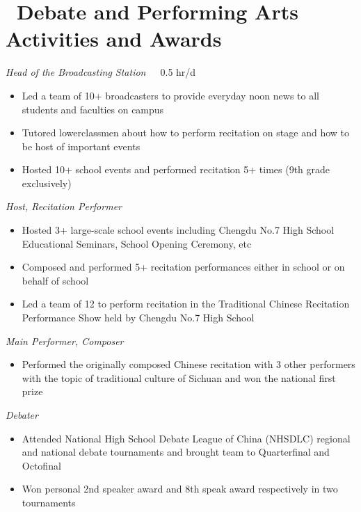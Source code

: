 \documentclass{resume}
\begin{document}

\section{\faHeartO\ Debate and Performing Arts Activities and Awards}
\emph{Head of the Broadcasting Station}\ \ \ 0.5 hr/d
\begin{itemize}
  \item Led a team of 10+ broadcasters to provide everyday noon news to all students and faculties on campus
  \item Tutored lowerclassmen about how to perform recitation on stage and how to be host of important events
  \item Hosted 10+ school events and performed recitation 5+ times (9th grade exclusively)
\end{itemize}

\emph{Host, Recitation Performer}
\begin{itemize}
  \item Hosted 3+ large-scale school events including Chengdu No.7 High School Educational Seminars, School Opening Ceremony, etc
  \item Composed and performed 5+ recitation performances either in school or on behalf of school
  \item Led a team of 12 to perform recitation in the Traditional Chinese Recitation Performance Show held by Chengdu No.7 High School
\end{itemize}

\emph{Main Performer, Composer}
\begin{itemize}
  \item Performed the originally composed Chinese recitation with 3 other performers with the topic of traditional culture of Sichuan and won the national first prize
\end{itemize}

\emph{Debater}
\begin{itemize}
  \item Attended National High School Debate League of China (NHSDLC) regional and national debate tournaments and brought team to Quarterfinal and Octofinal
  \item Won personal 2nd speaker award and 8th speak award respectively in two tournaments
\end{itemize}
\end{document}
